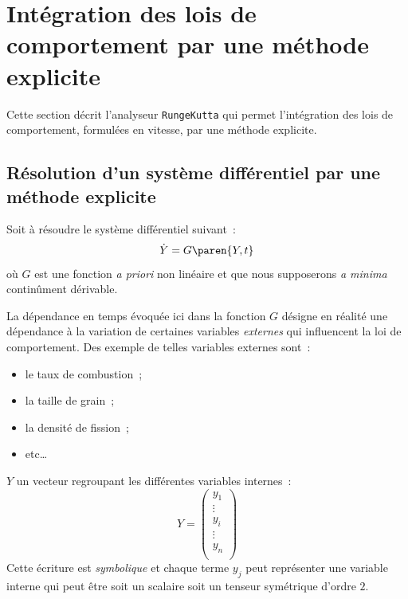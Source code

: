 \documentclass[rectoverso,pleiades,pstricks,leqno,anti]{texmf/note_technique_2010}
\begin{document}
\clearpage
\newpage
\section{Intégration des lois de comportement par une méthode explicite}
\label{sec:RK}

Cette section décrit l'analyseur \texttt{RungeKutta} qui permet
l'intégration des lois de comportement, formulées en vitesse, par une
méthode explicite.

\subsection{Résolution d'un système différentiel par une méthode explicite}
\label{sec:resol-dun-syst}

Soit à résoudre le système différentiel suivant~:
\begin{equation}
  \label{eq:systeme_diff}
  \dot{Y}=G\paren{Y,t}
\end{equation}
où \(G\) est une fonction {\em a priori} non linéaire et que nous
supposerons {\em a minima} continûment dérivable.

La dépendance en temps évoquée ici dans la fonction \(G\) désigne en
réalité une dépendance à la variation de certaines variables {\em
  externes} qui influencent la loi de comportement. Des exemple de
telles variables externes sont~:
\begin{minipage}[t]{0.5\linewidth}
  \begin{itemize}
    \item le taux de combustion~;
    \item la taille de grain~;
    \item la densité de fission~;
    \item etc\ldots
  \end{itemize}
\end{minipage}

\(Y\) un vecteur regroupant les différentes variables internes~:
\[
Y=
\begin{pmatrix}
  y_{1} \\
  \vdots \\
  y_{i} \\
  \vdots \\
  y_{n} \\
\end{pmatrix}
\]
Cette écriture est {\em symbolique} et chaque terme \(y_{j}\) peut
représenter une variable interne qui peut être soit un scalaire soit un
tenseur symétrique d'ordre \(2\).
\end{document}
